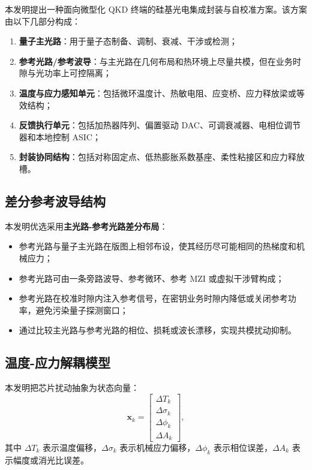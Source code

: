 \documentclass[12pt,a4paper]{article}
\begin{document}
本发明提出一种面向微型化 QKD 终端的硅基光电集成封装与自校准方案。该方案由以下几部分构成：
\begin{enumerate}[label=(\arabic*)]
    \item \textbf{量子主光路}：用于量子态制备、调制、衰减、干涉或检测；
    \item \textbf{参考光路/参考波导}：与主光路在几何布局和热环境上尽量共模，但在业务时隙与光功率上可控隔离；
    \item \textbf{温度与应力感知单元}：包括微环温度计、热敏电阻、应变桥、应力释放梁或等效结构；
    \item \textbf{反馈执行单元}：包括加热器阵列、偏置驱动 DAC、可调衰减器、电相位调节器和本地控制 ASIC；
    \item \textbf{封装协同结构}：包括对称固定点、低热膨胀系数基座、柔性粘接区和应力释放槽。
\end{enumerate}

\subsection{差分参考波导结构}

本发明优选采用\textbf{主光路-参考光路差分布局}：
\begin{itemize}[noitemsep]
    \item 参考光路与量子主光路在版图上相邻布设，使其经历尽可能相同的热梯度和机械应力；
    \item 参考光路可由一条旁路波导、参考微环、参考 MZI 或虚拟干涉臂构成；
    \item 参考光路在校准时隙内注入参考信号，在密钥业务时隙内降低或关闭参考功率，避免污染量子探测窗口；
    \item 通过比较主光路与参考光路的相位、损耗或波长漂移，实现共模扰动抑制。
\end{itemize}

\subsection{温度-应力解耦模型}

本发明把芯片扰动抽象为状态向量：
\[
\mathbf{x}_k =
\begin{bmatrix}
\Delta T_k \\
\Delta \sigma_k \\
\Delta \phi_k \\
\Delta A_k
\end{bmatrix},
\]
其中 $\Delta T_k$ 表示温度偏移，$\Delta \sigma_k$ 表示机械应力偏移，$\Delta \phi_k$ 表示相位误差，$\Delta A_k$ 表示幅度或消光比误差。
\end{document}
